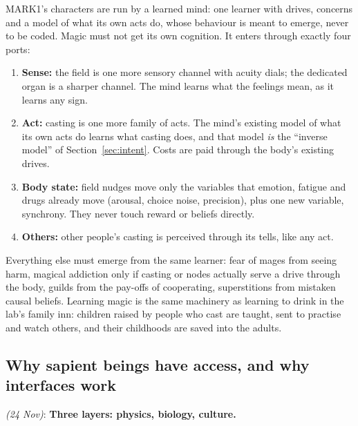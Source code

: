 \documentclass[11pt,a4paper]{article}
\newcommand{\decision}[3]{\par\smallskip\noindent{\color{dec}\textbf{Decision #1}} \textit{(#2)}: \textbf{#3}\par}
\begin{document}
MARK1's characters are run by a learned mind: one learner with drives, concerns and a model of what its own acts do, whose behaviour is meant to emerge, never to be coded. Magic must not get its own cognition. It enters through exactly four ports:
\begin{enumerate}
  \item \textbf{Sense:} the field is one more sensory channel with acuity dials; the dedicated organ is a sharper channel. The mind learns what the feelings mean, as it learns any sign.
  \item \textbf{Act:} casting is one more family of acts. The mind's existing model of what its own acts do learns what casting does, and that model \emph{is} the ``inverse model'' of Section~\ref{sec:intent}. Costs are paid through the body's existing drives.
  \item \textbf{Body state:} field nudges move only the variables that emotion, fatigue and drugs already move (arousal, choice noise, precision), plus one new variable, synchrony. They never touch reward or beliefs directly.
  \item \textbf{Others:} other people's casting is perceived through its tells, like any act.
\end{enumerate}
Everything else must emerge from the same learner: fear of mages from seeing harm, magical addiction only if casting or nodes actually serve a drive through the body, guilds from the pay-offs of cooperating, superstitions from mistaken causal beliefs. Learning magic is the same machinery as learning to drink in the lab's family inn: children raised by people who cast are taught, sent to practise and watch others, and their childhoods are saved into the adults.

\subsection{Why sapient beings have access, and why interfaces work}

\decision{Q2.6}{24 Nov}{Three layers: physics, biology, culture.}
\end{document}
